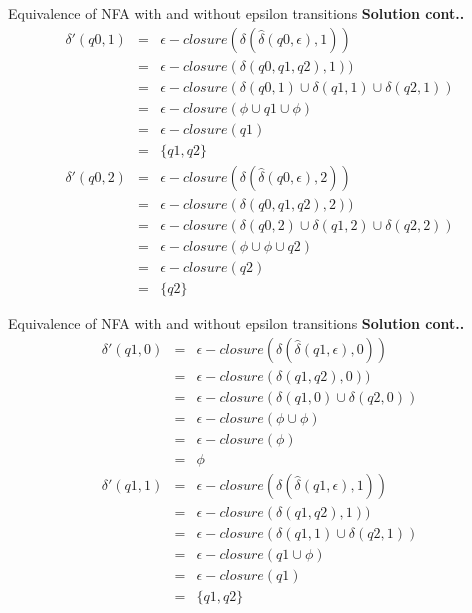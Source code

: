 \documentclass{beamer}
\begin{document}
\begin{frame}{Equivalence of NFA with and without epsilon transitions}
	\textbf{Solution cont..}
	\begin{eqnarray*}
		\delta'(q0,1) &=& \epsilon-closure(\delta(\hat{\delta}(q0,\epsilon),1))\\
		&=& \epsilon-closure(\delta(q0,q1,q2),1))\\
		&=& \epsilon-closure(\delta(q0, 1) \cup  \delta(q1, 1) \cup \delta(q2, 1) )\\
		&=& \epsilon-closure(\phi \cup q1 \cup \phi)\\
		&=& \epsilon-closure(q1)\\
		&=& \{q1, q2\}\\
		\delta'(q0, 2) &=& \epsilon-closure(\delta(\hat{\delta}(q0, \epsilon),2))\\
		&=& \epsilon-closure(\delta(q0,q1,q2), 2))\\
		&=& \epsilon-closure(\delta(q0, 2) \cup  \delta(q1, 2) \cup \delta(q2, 2) )\\
		&=& \epsilon-closure(\phi \cup \phi\cup q2)\\
		&=& \epsilon-closure(q2)\\
		&=& \{q2\}
	\end{eqnarray*}
\end{frame}
\begin{frame}{Equivalence of NFA with and without epsilon transitions}
	\textbf{Solution cont..}
	\begin{eqnarray*}
	\delta'(q1, 0) &=& \epsilon-closure(\delta(\hat{\delta}(q1, \epsilon),0))\\
		&=& \epsilon-closure(\delta(q1,q2), 0))\\
		&=& \epsilon-closure(\delta(q1, 0) \cup \delta(q2, 0) )\\
		&=& \epsilon-closure(\phi \cup \phi)\\
		&=& \epsilon-closure(\phi)\\
		&=& \phi\\
		\delta'(q1,1) &=& \epsilon-closure(\delta(\hat{\delta}(q1, \epsilon),1))\\
		&=& \epsilon-closure(\delta(q1,q2), 1))\\
		&=& \epsilon-closure(\delta(q1, 1) \cup \delta(q2, 1) )\\
		&=& \epsilon-closure(q1 \cup \phi)\\
		&=& \epsilon-closure(q1)\\
		&=& \{q1,q2\}
	\end{eqnarray*}
\end{frame}
\end{document}
